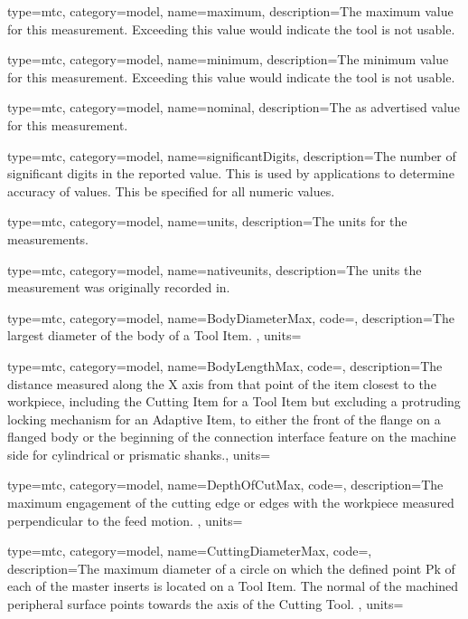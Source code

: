 {
  type=mtc,
  category=model,
  name={maximum},
  description={The maximum value for this measurement. Exceeding this value would indicate the tool is not usable.}
}


{
  type=mtc,
  category=model,
  name={minimum},
  description={The minimum value for this measurement. Exceeding this value would indicate the tool is not usable.}
}


{
  type=mtc,
  category=model,
  name={nominal},
  description={The as advertised value for this measurement.}
}


{
  type=mtc,
  category=model,
  name={significantDigits},
  description={The number of significant digits in the reported value. This is used by applications to determine accuracy of values. This \MAY be specified for all numeric values.}
}


{
  type=mtc,
  category=model,
  name={units},
  description={The units for the measurements. }
}


{
  type=mtc,
  category=model,
  name={nativeunits},
  description={The units the measurement was originally recorded in. }
}


{
  type=mtc,
  category=model,
  name={BodyDiameterMax},
  code=,
  description={The largest diameter of the body of a Tool Item. },
  units=
}


{
  type=mtc,
  category=model,
  name={BodyLengthMax},
  code=,
  description={The distance measured along the X axis from that point of the item closest to the workpiece, including the Cutting Item for a Tool Item but excluding a protruding locking mechanism for an Adaptive Item, to either the front of the flange on a flanged body or the beginning of the connection interface feature on the machine side for cylindrical or prismatic shanks.},
  units=
}


{
  type=mtc,
  category=model,
  name={DepthOfCutMax},
  code=,
  description={The maximum engagement of the cutting edge or edges with the workpiece measured perpendicular to the feed motion. },
  units=
}


{
  type=mtc,
  category=model,
  name={CuttingDiameterMax},
  code=,
  description={The maximum diameter of a circle on which the defined point Pk of each of the master inserts is located on a Tool Item. The normal of the machined peripheral surface points towards the axis of the Cutting Tool. },
  units=
}


